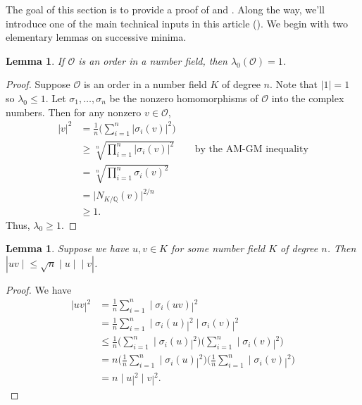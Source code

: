\documentclass[letterpaper,10pt]{amsart}
\DeclareMathOperator{\lv}{\lvert}
\DeclareMathOperator{\rv}{\rvert}
\newcommand{\QQ}{\mathbb{Q}}      %
\newcommand{\cO}{\mathcal{O}}      %
\newtheorem{lemma}[theorem]{Lemma}
\theoremstyle{definition}
\theoremstyle{remark}
\begin{document}
The goal of this section is to provide a proof of  and . Along the way, we'll introduce one of the main technical inputs in this article (). We begin with two elementary lemmas on successive minima. 

\begin{lemma}
\label{lem:lambda-zero}
If $\cO$ is an order in a number field, then $\lambda_0(\cO) = 1$.
\end{lemma}
\begin{proof}
Suppose $\cO$ is an order in a number field $K$ of degree $n$. Note that $\lvert 1 \rvert = 1$ so $\lambda_0 \leq 1$. Let $\sigma_1,\dots,\sigma_{n}$ be the nonzero homomorphisms of $\cO$ into the complex numbers. Then for any nonzero $v \in \cO$,
\begin{align*}
\lvert v \rvert^2 &= \frac{1}{n}\bigg(\sum_{i = 1}^{n} \lvert \sigma_i(v)\rvert^2\bigg) \\
&\geq \sqrt[n]{\prod_{i = 1}^{n} \lvert \sigma_i(v)\rvert^2} && \text{ by the AM-GM inequality} \\
&= \sqrt[n]{\prod_{i = 1}^{n}  \sigma_i(v)^2} \\
&= \lvert N_{K/\QQ}(v)\rvert^{2/n}  \\
& \geq 1.
\end{align*}
Thus, $\lambda_0 \geq 1$.
\end{proof}

\begin{lemma}
\label{lem:sqrt-n}
Suppose we have $u,v \in K$ for some number field $K$ of degree $n$. Then $\lv uv \rv \leq \sqrt{n}\lv u \rv \lv v \rv$.
\end{lemma}
\begin{proof}
We have
\begin{align*}
\lv uv \rv^2 &= \frac{1}{n}\sum_{i = 1}^n\lv \sigma_i(uv)\rv^2 \\
&= \frac{1}{n}\sum_{i = 1}^n\lv \sigma_i(u)\rv^2\lv \sigma_i(v)\rv^2 \\
&\leq \frac{1}{n}\Big (\sum_{i = 1}^n\lv \sigma_i(u)\rv^2 \Big)\Big(\sum_{i = 1}^n\lv \sigma_i(v)\rv^2\Big) \\
&= n\Big (\frac{1}{n}\sum_{i = 1}^n\lv \sigma_i(u)\rv^2 \Big)\Big(\frac{1}{n}\sum_{i = 1}^n\lv \sigma_i(v)\rv^2\Big) \\
&= n\lv u\rv^2\lv v\rv^2.
\end{align*}
\end{proof}
\end{document}
